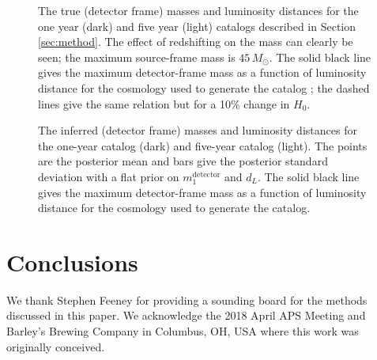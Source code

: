 \documentclass[modern]{aastex62}
\newcommand{\monedet}{m_1^\mathrm{detector}}
\newcommand{\MSourceMax}{45 \, \MSun}
\newcommand{\MSun}{M_\odot}
\begin{document}
\begin{figure}
%
  \caption{\label{fig:true-det-masses-dLs} The true (detector frame) masses and
  luminosity distances for the one year (dark) and five year (light) catalogs
  described in Section \ref{sec:method}.  The effect of redshifting on the mass
  can clearly be seen; the maximum source-frame mass is $\MSourceMax$.  The
  solid black line gives the maximum detector-frame mass as a function of
  luminosity distance for the cosmology used to generate the catalog
  \citep{Planck2016}; the dashed lines give the same relation but for a 10\%
  change in $H_0$.}
%
\end{figure}

\begin{figure}
%
  \caption{\label{fig:obs-det-masses-dLs} The inferred (detector frame) masses
  and luminosity distances for the one-year catalog (dark) and five-year catalog
  (light).  The points are the posterior mean and bars give the posterior
  standard deviation with a flat prior on $\monedet$ and $d_L$.  The solid black
  line gives the maximum detector-frame mass as a function of luminosity
  distance for the cosmology used to generate the catalog.}
%
\end{figure}

\section{Conclusions}

\acknowledgments

We thank Stephen Feeney for providing a sounding board for the methods discussed
in this paper.  We acknowledge the 2018 April APS Meeting and Barley's Brewing
Company in Columbus, OH, USA where this work was originally conceived.


\end{document}
